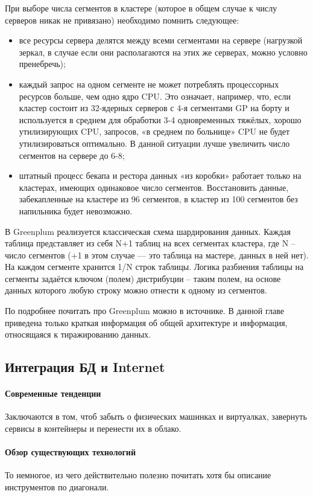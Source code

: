 При выборе числа сегментов в кластере (которое в общем случае к числу серверов никак не привязано) необходимо помнить
следующее:
\begin{itemize}
    \item все ресурсы сервера делятся между всеми сегментами на сервере (нагрузкой зеркал, в случае если они располагаются на этих же серверах, можно условно пренебречь);
    \item каждый запрос на одном сегменте не может потреблять процессорных ресурсов больше, чем одно ядро CPU. Это означает, например, что, если кластер состоит из 32-ядерных серверов с 4-я сегментами GP на борту и используется в среднем для обработки 3-4 одновременных тяжёлых, хорошо утилизирующих CPU, запросов, «в среднем по больнице» CPU не будет утилизироваться оптимально. В данной ситуации лучше увеличить число сегментов на сервере до 6-8;
    \item штатный процесс бекапа и рестора данных «из коробки» работает только на кластерах, имеющих одинаковое число сегментов. Восстановить данные, забекапленные на кластере из 96 сегментов, в кластер из 100 сегментов без напильника будет невозможно.
\end{itemize}

В Greenplum реализуется классическая схема шардирования данных. Каждая таблица представляет из себя N+1 таблиц на всех
сегментах кластера, где N – число сегментов (+1 в этом случае — это таблица на мастере, данных в ней нет). На каждом
сегменте хранится 1/N строк таблицы. Логика разбиения таблицы на сегменты задаётся ключом (полем) дистрибуции – таким
полем, на основе данных которого любую строку можно отнести к одному из сегментов.

По подробнее почитать про Greenplum можно в источнике. В данной главе приведена только краткая информация об общей
архитектуре и информация, относящаяся к тиражированию данных. \autocite{Greenplum}

\subsection{Интеграция БД и Internet}
\paragraph{Современные тенденции}
Заключаются в том, чтоб забыть о физических машинках и виртуалках, завернуть сервисы в контейнеры и перенести их в облако.

\paragraph{Обзор существующих технологий}
То немногое, из чего действительно полезно почитать хотя бы описание инструментов по диагонали.

